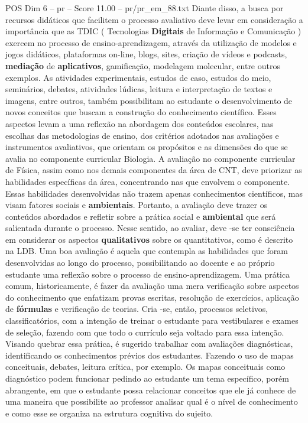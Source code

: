 \begin{textsample}{POS Dim 6 – pr – Score 11.00 – pr/pr\_em\_88.txt}
Diante disso, a busca por recursos didáticos que facilitem o processo avaliativo deve levar em consideração a importância que as TDIC ( Tecnologias \textbf{Digitais} de Informação e Comunicação ) exercem no processo de ensino-aprendizagem, através da utilização de modelos e jogos didáticos, plataformas on-line, blogs, sites, criação de vídeos e podcasts, \textbf{mediação} de \textbf{aplicativos}, gamificação, modelagem molecular, entre outros exemplos.
As atividades experimentais, estudos de caso, estudos do meio, seminários, debates, atividades lúdicas, leitura e interpretação de textos e imagens, entre outros, também possibilitam ao estudante o desenvolvimento de novos conceitos que buscam a construção do conhecimento científico.
Esses aspectos levam a uma reflexão na abordagem dos conteúdos escolares, nas escolhas das metodologias de ensino, dos critérios adotados nas avaliações e instrumentos avaliativos, que orientam os propósitos e as dimensões do que se avalia no componente curricular Biologia.
A avaliação no componente curricular de Física, assim como nos demais componentes da área de CNT, deve priorizar as habilidades específicas da área, concentrando nas que envolvem o componente.
Essas habilidades desenvolvidas não trazem apenas conhecimentos científicos, mas visam fatores sociais e \textbf{ambientais}.
Portanto, a avaliação deve trazer os conteúdos abordados e refletir sobre a prática social e \textbf{ambiental} que será salientada durante o processo.
Nesse sentido, ao avaliar, deve -se ter consciência em considerar os aspectos \textbf{qualitativos} sobre os quantitativos, como é descrito na LDB.
Uma boa avaliação é aquela que contempla as habilidades que foram desenvolvidas ao longo do processo, possibilitando ao docente e ao próprio estudante uma reflexão sobre o processo de ensino-aprendizagem.
Uma prática comum, historicamente, é fazer da avaliação uma mera verificação sobre aspectos do conhecimento que enfatizam provas escritas, resolução de exercícios, aplicação de \textbf{fórmulas} e verificação de teorias.
Cria -se, então, processos seletivos, classificatórios, com a intenção de treinar o estudante para vestibulares e exames de seleção, fazendo com que todo o currículo seja voltado para essa intenção.
Visando quebrar essa prática, é sugerido trabalhar com avaliações diagnósticas, identificando os conhecimentos prévios dos estudantes.
Fazendo o uso de mapas conceituais, debates, leitura crítica, por exemplo.
Os mapas conceituais como diagnóstico podem funcionar pedindo ao estudante um tema específico, porém abrangente, em que o estudante possa relacionar conceitos que ele já conhece de uma maneira que possibilite ao professor analisar qual é o nível de conhecimento e como esse se organiza na estrutura cognitiva do sujeito.

\end{textsample}
